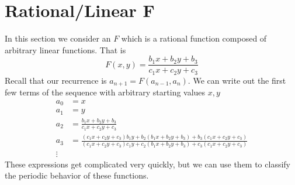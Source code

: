 \documentclass[12pt]{article}
\begin{document}
\section{Rational/Linear F}
In this section we consider an $F$ which is a rational function composed of arbitrary linear functions. That is 
\begin{equation}
\label{rationallinear}
F(x,y) = \frac{ b_1 x + b_2 y + b_3}{ c_1 x+ c_2 y + c_3}
\end{equation}
Recall that our recurrence is $a_{n+1} = F( a_{n-1}, a_n)$. We can write out the first few terms of the sequence with arbitrary starting values $x,y$
\begin{align}
a_0 &= x \\ 
a_1 &=y \\
a_2 &= \frac{ b_1 x + b_2 y + b_3}{ c_1 x+ c_2 y + c_3}\\
\label{athree}a_3 &= \frac{(c_1 x+ c_2 y + c_3) b_1 y + b_2 (b_1 x + b_2 y + b_3)+ b_3(c_1 x+ c_2 y + c_3)}{ (c_1 x+ c_2 y + c_3)c_1 y+ c_2 (b_1 x + b_2 y + b_3) + c_3(c_1 x+ c_2 y + c_3)} \\
\vdots
\end{align}
These expressions get complicated very quickly, but we can use them to classify the periodic behavior of these functions.
\end{document}
